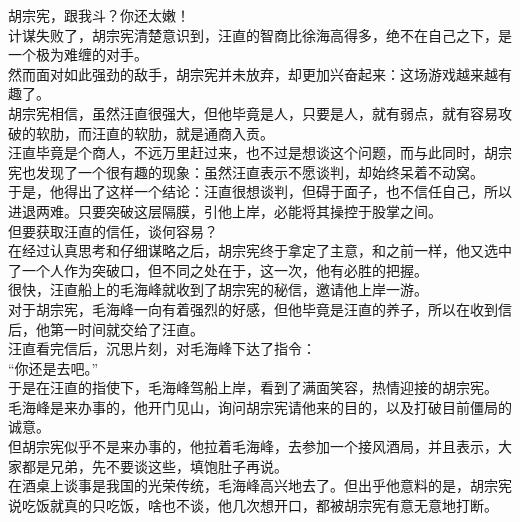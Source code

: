 \begin{multicols}{\theparacolNo}
胡宗宪，跟我斗？你还太嫩！\\

计谋失败了，胡宗宪清楚意识到，汪直的智商比徐海高得多，绝不在自己之下，是一个极为难缠的对手。\\

然而面对如此强劲的敌手，胡宗宪并未放弃，却更加兴奋起来：这场游戏越来越有趣了。\\

胡宗宪相信，虽然汪直很强大，但他毕竟是人，只要是人，就有弱点，就有容易攻破的软肋，而汪直的软肋，就是通商入贡。\\

汪直毕竟是个商人，不远万里赶过来，也不过是想谈这个问题，而与此同时，胡宗宪也发现了一个很有趣的现象：虽然汪直表示不愿谈判，却始终呆着不动窝。\\

于是，他得出了这样一个结论：汪直很想谈判，但碍于面子，也不信任自己，所以进退两难。只要突破这层隔膜，引他上岸，必能将其操控于股掌之间。\\

但要获取汪直的信任，谈何容易？\\

在经过认真思考和仔细谋略之后，胡宗宪终于拿定了主意，和之前一样，他又选中了一个人作为突破口，但不同之处在于，这一次，他有必胜的把握。\\

很快，汪直船上的毛海峰就收到了胡宗宪的秘信，邀请他上岸一游。\\

对于胡宗宪，毛海峰一向有着强烈的好感，但他毕竟是汪直的养子，所以在收到信后，他第一时间就交给了汪直。\\

汪直看完信后，沉思片刻，对毛海峰下达了指令：\\

“你还是去吧。”\\

于是在汪直的指使下，毛海峰驾船上岸，看到了满面笑容，热情迎接的胡宗宪。\\

毛海峰是来办事的，他开门见山，询问胡宗宪请他来的目的，以及打破目前僵局的诚意。\\

但胡宗宪似乎不是来办事的，他拉着毛海峰，去参加一个接风酒局，并且表示，大家都是兄弟，先不要谈这些，填饱肚子再说。\\

在酒桌上谈事是我国的光荣传统，毛海峰高兴地去了。但出乎他意料的是，胡宗宪说吃饭就真的只吃饭，啥也不谈，他几次想开口，都被胡宗宪有意无意地打断。\\


\end{multicols}

